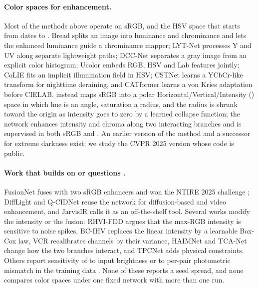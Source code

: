 \paragraph{Color spaces for enhancement.} Most of the methods above operate on sRGB, and the
HSV space that \mname starts from dates to \citet{smith1978hsv}. Bread \citep{guo2023bread}
splits an image into luminance and chrominance and lets the enhanced luminance guide a
chrominance mapper; LYT-Net \citep{brateanu2025lytnet} processes Y and UV along separate
lightweight paths; DCC-Net \citep{zhang2022dccnet} separates a gray image from an explicit
color histogram; Ucolor \citep{li2021ucolor} embeds RGB, HSV and Lab features jointly; CoLIE
\citep{chobola2024colie} fits an implicit illumination field in HSV; CSTNet
\citep{guan2025cstnet} learns a YCbCr-like transform for nighttime deraining, and CATformer
\citep{wu2026catformer} learns a von Kries adaptation before CIELAB. \mname
\citep{yan2025hvi} instead maps sRGB into a polar Horizontal/Vertical/Intensity (\hvi)
space in which hue is an angle, saturation a radius, and the radius is shrunk toward the
origin as intensity goes to zero by a learned collapse function; the network enhances
intensity and chroma along two interacting branches and is supervised in both sRGB and
\hvi. An earlier version of the method \citep{yan2024onecolorspace} and a successor for
extreme darkness \citep{yan2025hvicidnetplus} exist; we study the CVPR 2025 version whose
code is public.

\paragraph{Work that builds on or questions \hvi.} FusionNet \citep{shi2025fusionnet}
fuses \mname with two sRGB enhancers and won the NTIRE 2025 challenge
\citep{liu2025ntire}; DiffLight \citep{feng2024difflight} and Q-CIDNet
\citep{verma2025qcidnet} reuse the network for diffusion-based and video enhancement, and
JarvisIR \citep{lin2025jarvisir} calls it as an off-the-shelf tool. Several works modify the
intensity or the fusion: RHVI-FDD \citep{yang2026rhvifdd} argues that the max-RGB intensity
is sensitive to noise spikes, BC-IHV \citep{ai2026bcihv} replaces the linear intensity by a
learnable Box-Cox law, VCR \citep{cheng2026vcr} recalibrates channels by their variance,
HAIMNet \citep{wang2026haimnet} and TCA-Net \citep{wu2026tcanet} change how the two
branches interact, and TPCNet \citep{shi2025tpcnet} adds physical constraints. Others report
sensitivity of \mname to input brightness \citep{pilligua2025mill, du2026atp} or to
per-pair photometric mismatch in the training data \citep{li2026pal}. None of these reports
a seed spread, and none compares color spaces under one fixed network with more than one run.

